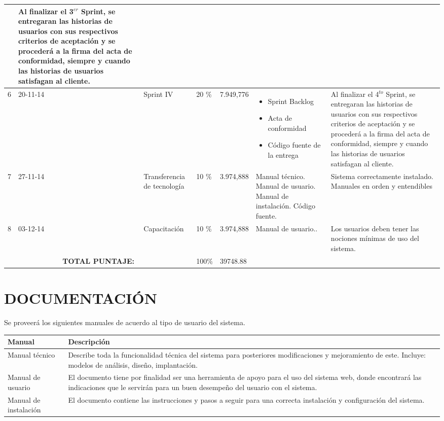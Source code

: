 \documentclass[11pt,letterpaper]{report}
\begin{document}
{\begin{longtable}{|p{0.8cm}|p{1.5cm}|p{1.5cm}|p{1.20cm}|p{1.5cm}|p{3cm}|p{4cm}|}
\begin{itemize}
	  	 		\end{itemize}
	  	 & Al finalizar el 3$^{er}$ Sprint, se entregaran las historias de usuarios con sus respectivos criterios de aceptación y se procederá a la firma del acta de conformidad, siempre y cuando las historias de usuarios satisfagan al cliente.\\ \hline
	 6 & 20-11-14 & Sprint IV & 20 \% & 7.949,776 &
	 \begin{itemize}
	 	 			\item Sprint Backlog
	 	 			\item Acta de conformidad
	 	 			\item Código fuente de la entrega 
	 	 		\end{itemize}
	 	 & Al finalizar el 4$^{to}$ Sprint, se entregaran las historias de usuarios con sus respectivos criterios de aceptación y se procederá a la firma del acta de conformidad, siempre y cuando las historias de usuarios satisfagan al cliente.\\ \hline
	 7 & 27-11-14 & Transferencia de tecnología & 10 \% & 3.974,888 & Manual técnico. Manual de usuario. Manual de instalación. Código fuente. & Sistema correctamente instalado. Manuales en orden y entendibles \\ \hline
	 		8 & 03-12-14 & Capacitación & 10 \% & 3.974,888 & Manual de usuario.. & Los usuarios deben tener las nociones mínimas de uso del sistema.\\ \hline
	 		
	 	\multicolumn{3}{|c|}{\textbf{TOTAL PUNTAJE:}} & 100\% & 39748.88& & \\ \hline
\end{longtable}
}

\chapter{DOCUMENTACIÓN}
Se proveerá los siguientes manuales de acuerdo al tipo de usuario del sistema.\\
\begin{center}
	\begin{tabular}{|l|p{8cm}|}
		\hline
		\textbf{Manual} & \textbf{Descripción} \\ \hline
		Manual técnico & Describe toda la funcionalidad técnica del sistema para posteriores modificaciones y mejoramiento de este.
		Incluye: modelos de análisis, diseño, implantación. \\ \hline
		Manual de usuario & El documento tiene por finalidad ser una herramienta de apoyo para el uso del sistema web, donde encontrará las indicaciones que le servirán para un buen desempeño del usuario con el sistema. \\ \hline
		Manual de instalación & El documento contiene las instrucciones y pasos a seguir para una correcta instalación y configuración del sistema. \\ \hline
	\end{tabular}
\end{center}
\end{document}
